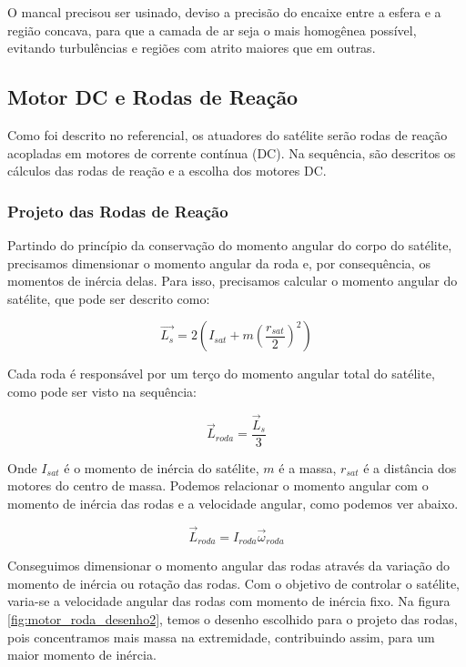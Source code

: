 O mancal precisou ser usinado, deviso a precisão do encaixe entre a esfera e a região concava, para que a camada de ar seja o mais homogênea possível, evitando turbulências e regiões com atrito maiores que em outras. 



\subsection{Motor DC e Rodas de Reação}

Como foi descrito no referencial, os atuadores do satélite serão rodas de reação acopladas em motores de corrente contínua (DC). Na sequência, são descritos os cálculos das rodas de reação e a escolha dos motores DC. 


\subsubsection{Projeto das Rodas de Reação}

Partindo do princípio da conservação do momento angular do corpo do satélite, precisamos dimensionar o momento angular da roda e, por consequência, os momentos de inércia delas. Para isso, precisamos calcular o momento angular do satélite, que pode ser descrito como:

\begin{equation}
\vec{L_s} = 2\left(I_{sat} + m\left(\frac{r_{sat}}{2}\right)^2\right)  
\end{equation}

Cada roda é responsável por um terço do momento angular total do satélite, como pode ser visto na sequência:

\begin{equation}
\vec{L}_{roda} = \frac{\vec{L}_s}{3}   
\end{equation}

Onde $I_{sat}$ é o momento de inércia do satélite, $m$ é a massa, $r_{sat}$ é a distância dos motores do centro de massa. Podemos relacionar o momento angular com o momento de inércia das rodas e a velocidade angular, como podemos ver abaixo.

\begin{equation}
\vec{L}_{roda} = I_{roda}\vec{\omega}_{roda}
\end{equation}

Conseguimos dimensionar o momento angular das rodas através da variação do momento de inércia ou rotação das rodas. Com o objetivo de controlar o satélite, varia-se a velocidade angular das rodas com momento de inércia fixo. Na figura \ref{fig:motor_roda_desenho2}, temos o desenho escolhido para o projeto das rodas, pois concentramos mais massa na extremidade, contribuindo assim, para um maior momento de inércia.

